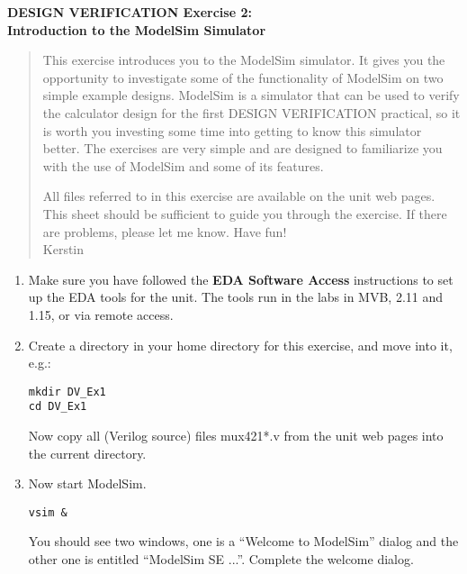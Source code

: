 \documentclass[a4paper,11pt]{article}
\begin{document}
\thispagestyle{empty}
\begin{center}
{\Large\bf DESIGN VERIFICATION Exercise 2: \\
\smallskip Introduction to the ModelSim Simulator}
\end{center}

\begin{quote}
  This exercise introduces you to the ModelSim simulator. It gives you the
  opportunity to investigate some of the functionality of ModelSim on two
  simple example designs. ModelSim is a simulator that can be used to verify
  the calculator design for the first DESIGN VERIFICATION practical, so it is
  worth you investing some time into getting to know this simulator better. The
  exercises are very simple and are designed to familiarize you with the use of
  ModelSim and some of its features.
  
  All files referred to in this exercise are available on the unit web
  pages. This sheet should be sufficient to guide you through
  the exercise. If there are problems, please let me know. Have fun! \\
  \hspace*{125mm} Kerstin
\end{quote}

\smallskip
{}
\smallskip

\begin{enumerate}
\item Make sure you have followed the {\bf EDA Software Access} instructions to set up the EDA tools for the unit. The tools run in the labs in MVB, 2.11 and 1.15, or via remote access.

\item Create a directory in your home directory for this exercise, 
and move into it, e.g.:

\verb#mkdir DV_Ex1#\\
\verb#cd DV_Ex1#

Now copy all (Verilog source) files mux421*.v from the unit web pages 
into the current directory. 

\item Now start ModelSim.

\verb#vsim &#

You should see two windows, one is a ``Welcome to ModelSim'' dialog and the
other one is entitled ``ModelSim SE ...''.  Complete the welcome dialog.
\end{enumerate}

\smallskip
{}
\smallskip
\end{document}
